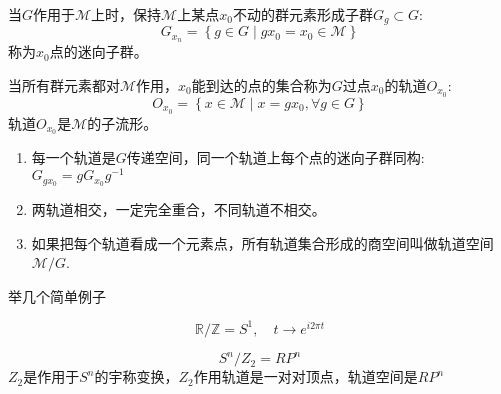 \documentclass{article}
\numberwithin{equation}{subsection}
\newcommand{\mM}{\mathcal{M}}
\begin{document}
当$G$作用于$\mM$上时，保持$\mM$上某点$x_0$不动的群元素形成子群$G_g\subset G$:
\begin{equation}
    G_{x_{n}}=\left\{g \in G \mid g x_{0}=x_{0} \in \mM\right\}
\end{equation}
称为$x_0$点的迷向子群。

当所有群元素都对$\mM$作用，$x_0$能到达的点的集合称为$G$过点$x_0$的轨道$O_{x_0}$:
\begin{equation}
    O_{x_{0}}=\left\{x \in \mathcal{M} \mid x=g x_{0}, \forall g \in G\right\}
\end{equation}
轨道$O_{x_0}$是$\mM$的子流形。
\begin{enumerate}
    \item 每一个轨道是$G$传递空间，同一个轨道上每个点的迷向子群同构:$G_{gx_0}=gG_{x_0}g^{-1}$
    \item 两轨道相交，一定完全重合，不同轨道不相交。
    \item 如果把每个轨道看成一个元素点，所有轨道集合形成的商空间叫做轨道空间$\mM/G$.
\end{enumerate}
举几个简单例子

\begin{equation}
    \mathbb{R}/\mathbb{Z}=S^1,\quad t\rightarrow e^{i2\pi t}
\end{equation}

\begin{equation}
    S^n/Z_2=RP^n
\end{equation}
$Z_2$是作用于$S^n$的宇称变换，$Z_2$作用轨道是一对对顶点，轨道空间是$RP^n$
\end{document}

